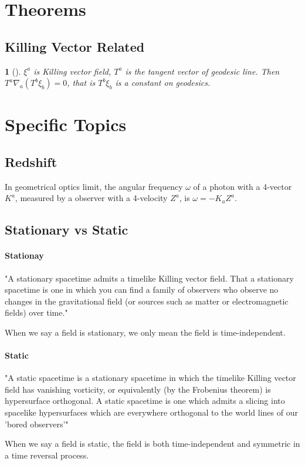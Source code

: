\section{Theorems}

\subsection{Killing Vector Related}

\newtheorem{theorem}{}[chapter]

\begin{theorem}[]
$\xi^a$ is Killing vector field, $T^a$ is the tangent vector of geodesic line. Then $T^a\nabla_a(T^b\xi_b)=0$, that is $T^b\xi_b$ is a constant on geodesics.
\end{theorem}





\section{Specific Topics}
\subsection{Redshift}

In geometrical optics limit, the angular frequency $\omega$ of a photon with a 4-vector $K^a$, measured by a observer with a 4-velocity $Z^a$, is $\omega=-K_aZ^a$.

\subsection{Stationary vs Static}

\paragraph{Stationay}
"A stationary spacetime admits a timelike Killing vector field. That a stationary spacetime is one in which you can find a family of observers who observe no changes in the gravitational field (or sources such as matter or electromagnetic fields) over time."

When we say a field is stationary, we only mean the field is time-independent.

\paragraph{Static}
"A static spacetime is a stationary spacetime in which the timelike Killing vector field has vanishing vorticity, or equivalently (by the Frobenius theorem) is hypersurface orthogonal. A static spacetime is one which admits a slicing into spacelike hypersurfaces which are everywhere orthogonal to the world lines of our 'bored observers'"

When we say a field is static, the field is both time-independent and symmetric in a time reversal process.



